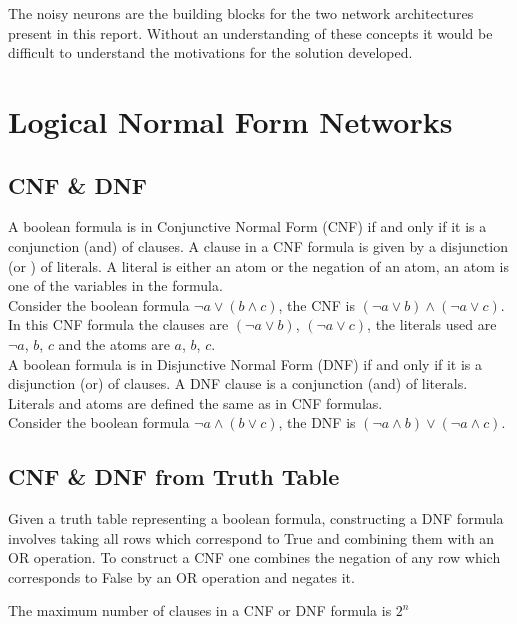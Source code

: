 The noisy neurons are the building blocks for the two network architectures present in this report. Without an understanding of these concepts it would be difficult to understand the motivations for the solution developed.

\section{Logical Normal Form Networks}
\subsection{CNF \& DNF}
A boolean formula is in Conjunctive Normal Form (CNF) if and only if it is a conjunction (and) of clauses. A clause in a CNF formula is given by a disjunction (or ) of literals. A literal is either an atom or the negation of an atom, an atom is one of the variables in the formula.\\

Consider the boolean formula $\lnot a \lor (b \land c)$, the CNF is $(\lnot a \lor b) \land (\lnot a \lor c)$. In this CNF formula the clauses are $(\lnot a \lor b)$, $(\lnot a \lor c)$, the literals used are $\lnot a$, $b$, $c$ and the atoms are $a$, $b$, $c$.\\

A boolean formula is in Disjunctive Normal Form (DNF) if and only if it is a disjunction (or) of clauses. A DNF clause is a conjunction (and) of literals. Literals and atoms are defined the same as in CNF formulas.\\

Consider the boolean formula $\lnot a \land (b \lor c)$, the DNF is $(\lnot a \land b) \lor (\lnot a \land c)$.\\

\subsection{CNF \& DNF from Truth Table} \label{subsec:construct-cnfdnf}
Given a truth table representing a boolean formula, constructing a DNF formula involves taking all rows which correspond to True and combining them with an OR operation. To construct a CNF one combines the negation of any row which corresponds to False by an OR operation and negates it.

\begin{theorem}
	The maximum number of clauses in a CNF or DNF formula is $2^n$
	\label{thm:max-clause-cnfdnf}
\end{theorem}


